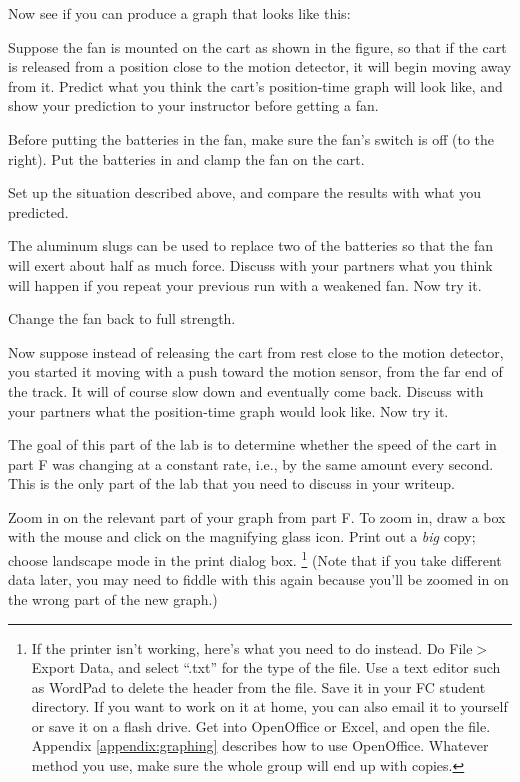 Now see if you can produce a graph that looks like this:



Suppose the fan is mounted on the cart as shown in the
figure, so that if the cart is released from a position
close to the motion detector, it will begin moving away from
it. Predict what you think the cart's position-time graph
will look like, and show your prediction to your instructor
before getting a fan.

Before putting the batteries in the fan, make sure the fan's
switch is off (to the right). Put the batteries in and clamp
the fan on the cart.

Set up the situation described above, and compare the
results with what you predicted.

\label{part:kinematics:slowandrapidaccel}

The aluminum slugs can be used to replace two of the
batteries so that the fan will exert about half as much
force. Discuss with your partners what you think will happen
if you repeat your previous run with a weakened fan. Now try it.


Change the fan back to full strength.

Now suppose instead of releasing the cart from rest close to
the motion detector, you started it moving with a push
toward the motion sensor, from the far end of the track. It
will of course slow down and eventually come back. Discuss
with your partners what the position-time graph would
look like. Now try it.


The goal of this part of the lab is to determine whether the speed
of the cart in part F was changing at a constant rate, i.e., by the
same amount every second. This is the only part of the lab that you
need to discuss in your writeup.

Zoom in on the relevant part of your graph from part F.
To zoom in,  draw a box with the mouse and click on the magnifying glass icon.
Print out a \emph{big} copy; choose landscape mode in the print dialog box.
\footnote{If the printer isn't working, here's what you need to do instead.
Do File$>$Export Data, and select ``.txt'' for the
type of the file. Use a text editor such as WordPad to
delete the header from the
file. Save it in your FC student directory. If you want to work
on it at home, you can also email it to yourself or save it on a flash drive.
Get into OpenOffice or Excel, and open the file.
Appendix \ref{appendix:graphing} describes how to use
OpenOffice.
Whatever method you use, make sure the whole group
will end up with copies.}
(Note that if you take
different data later, you may need to fiddle with this again
because you'll be zoomed in on the wrong part of the new graph.)

